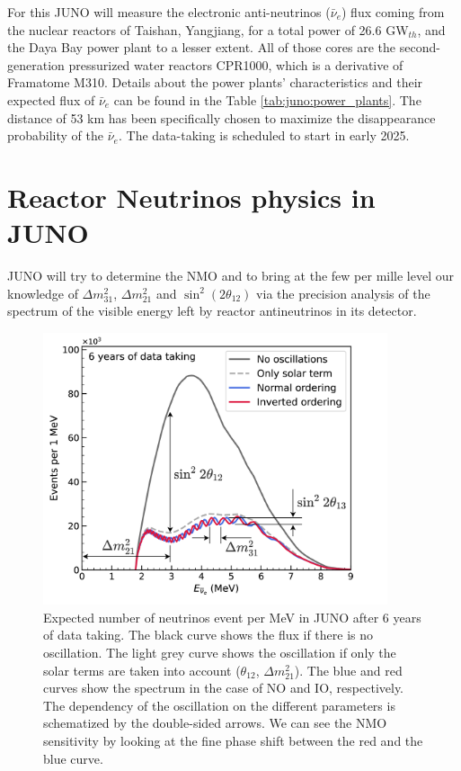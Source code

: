 \documentclass[../main.tex]{subfiles}
\begin{document}
For this JUNO will measure the electronic anti-neutrinos ($\bar{\nu}_e$) flux coming from the nuclear reactors of Taishan, Yangjiang, for a total power of 26.6 GW$_{th}$, and the Daya Bay power plant to a lesser extent. All of those cores are the second-generation pressurized water reactors CPR1000, which is a derivative of Framatome M310. Details about the power plants' characteristics and their expected flux of $\bar{\nu}_e$ can be found in the Table \ref{tab:juno:power_plants}.
The distance of 53 km has been specifically chosen to maximize the disappearance probability of the $\bar{\nu}_e$. The data-taking is scheduled to start in early 2025.

\section{Reactor Neutrinos physics in JUNO}

JUNO will try to determine the NMO and to bring at the few per mille level our knowledge of $\Delta m^2_{31}$,  $\Delta m^2_{21}$ and $\sin^2(2\theta_{12})$  via the precision analysis of the spectrum of the visible energy left by reactor antineutrinos in its detector.

\begin{figure}
  \centering
  \includegraphics[height=8cm]{images/juno/Spectrum-OscillationsOnly_dm2_31.png}
  \caption{Expected number of neutrinos event per MeV in JUNO after 6 years of data taking. The black curve shows the flux if there is no oscillation. The light grey curve shows the oscillation if only the solar terms are taken into account ($\theta_{12}$, $\Delta m_{21}^2$). The blue and red curves show the spectrum in the case of NO and IO, respectively. The dependency of the oscillation on the different parameters is schematized by the double-sided arrows. We can see the NMO sensitivity by looking at the fine phase shift between the red and the blue curve.}
  \label{fig:juno:juno-spectrum-oscillation}
\end{figure}
\end{document}
